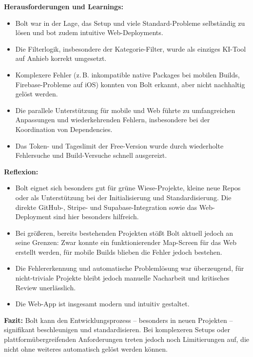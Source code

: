 \textbf{Herausforderungen und Learnings:}
\begin{itemize}
      \item Bolt war in der Lage, das Setup und viele Standard-Probleme selbständig zu
            lösen und bot zudem intuitive Web-Deployments.
      \item Die Filterlogik, insbesondere der Kategorie-Filter, wurde als einziges KI-Tool
            auf Anhieb korrekt umgesetzt.
      \item Komplexere Fehler (z.\,B. inkompatible native Packages bei mobilen Builds,
            Firebase-Probleme auf iOS) konnten von Bolt erkannt, aber nicht nachhaltig
            gelöst werden.
      \item Die parallele Unterstützung für mobile und Web führte zu umfangreichen
            Anpassungen und wiederkehrenden Fehlern, insbesondere bei der Koordination von
            Dependencies.
      \item Das Token- und Tageslimit der Free-Version wurde durch wiederholte Fehlersuche
            und Build-Versuche schnell ausgereizt.
\end{itemize}

\textbf{Reflexion:}
\begin{itemize}
      \item Bolt eignet sich besonders gut für grüne Wiese-Projekte, kleine neue Repos oder
            als Unterstützung bei der Initialisierung und Standardisierung. Die direkte
            GitHub-, Stripe- und Supabase-Integration sowie das Web-Deployment sind hier
            besonders hilfreich.
      \item Bei größeren, bereits bestehenden Projekten stößt Bolt aktuell jedoch an seine
            Grenzen: Zwar konnte ein funktionierender Map-Screen für das Web erstellt
            werden, für mobile Builds blieben die Fehler jedoch bestehen.
      \item Die Fehlererkennung und automatische Problemlösung war überzeugend, für
            nicht-triviale Projekte bleibt jedoch manuelle Nacharbeit und kritisches Review
            unerlässlich.
      \item Die Web-App ist insgesamt modern und intuitiv gestaltet.
\end{itemize}

\textbf{Fazit:}
Bolt kann den Entwicklungsprozess – besonders in neuen Projekten – signifikant beschleunigen und standardisieren. Bei komplexeren Setups oder plattformübergreifenden Anforderungen treten jedoch noch Limitierungen auf, die nicht ohne weiteres automatisch gelöst werden können.

